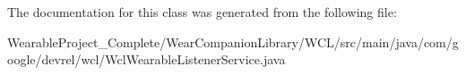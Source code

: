 The documentation for this class was generated from the following file\+:\begin{DoxyCompactItemize}
\item 
Wearable\+Project\+\_\+\+Complete/\+Wear\+Companion\+Library/\+W\+C\+L/src/main/java/com/google/devrel/wcl/Wcl\+Wearable\+Listener\+Service.\+java\end{DoxyCompactItemize}

